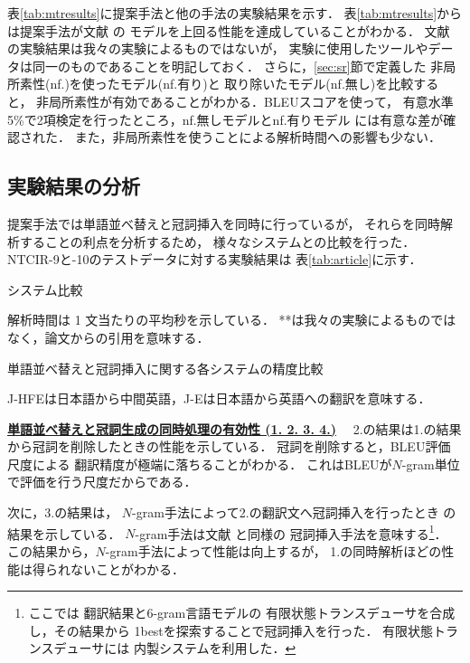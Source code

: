 \documentclass[japanese]{jnlp_1.4}
\begin{document}
表\ref{tab:mtresults}に提案手法と他の手法の実験結果を示す．
表\ref{tab:mtresults}からは提案手法が文献 \cite{Goto:12}の
モデルを上回る性能を達成していることがわかる．
文献 \cite{Goto:12}の実験結果は我々の実験によるものではないが，
実験に使用したツールやデータは同一のものであることを明記しておく．
さらに，\ref{sec:sr}節で定義した
非局所素性(nf.)を使ったモデル(nf.有り)と
取り除いたモデル(nf.無し)を比較すると，
非局所素性が有効であることがわかる．BLEUスコアを使って，
有意水準5\%で2項検定を行ったところ，nf.無しモデルとnf.有りモデル
には有意な差が確認された．
また，非局所素性を使うことによる解析時間への影響も少ない．


\subsection{実験結果の分析}


提案手法では単語並べ替えと冠詞挿入を同時に行っているが，
それらを同時解析することの利点を分析するため，
様々なシステムとの比較を行った．
NTCIR-9と-10のテストデータに対する実験結果は
表\ref{tab:article}に示す．

\begin{table}[b]
  \caption{システム比較}
  \label{tab:mtresults}

\small
解析時間は 1 文当たりの平均秒を示している． **は我々の実験によるものではなく，論文からの引用を意味する．\par
\end{table}
\begin{table}[b]
\caption{単語並べ替えと冠詞挿入に関する各システムの精度比較}
\label{tab:article}

\small
J-HFEは日本語から中間英語，J-Eは日本語から英語への翻訳を意味する．\par
\end{table}

\vspace{1\Cvs}\noindent
\textbf{\underline{単語並べ替えと冠詞生成の同時処理の有効性 (1. 2. 3. 4.)}}
　2.の結果は1.の結果から冠詞を削除したときの性能を示している．
冠詞を削除すると，BLEU評価尺度による
翻訳精度が極端に落ちることがわかる．
これはBLEUが$N$-gram単位で評価を行う尺度だからである．

次に，3.の結果は，
$N$-gram手法によって2.の翻訳文へ冠詞挿入を行ったとき
の結果を示している．
$N$-gram手法は文献 \cite{Goto:12}と同様の
冠詞挿入手法を意味する\footnote{ここでは
翻訳結果と6-gram言語モデルの
有限状態トランスデューサを合成し，その結果から
1bestを探索することで冠詞挿入を行った．
有限状態トランスデューサには
内製システムを利用した．}．
この結果から，$N$-gram手法によって性能は向上するが，
1.の同時解析ほどの性能は得られないことがわかる．
\end{document}
